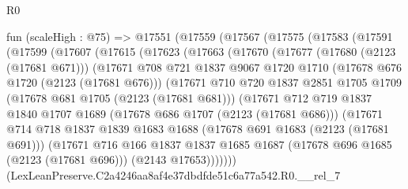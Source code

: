 \begin{lexlean}{R0}
\begin{coremodule}
        fun (scaleHigh : @75) =>
        @17551
          (@17559
            (@17567
              (@17575
                (@17583
                  (@17591
                    (@17599
                      (@17607
                        (@17615
                          (@17623
                            (@17663
                              (@17670
                                (@17677
                                  (@17680 (@2123 (@17681 @671)))
                                  (@17671
                                    @708
                                    @721
                                    @1837
                                    @9067
                                    @1720
                                    @1710
                                    (@17678 @676 @1720 (@2123 (@17681 @676)))
                                    (@17671
                                      @710
                                      @720
                                      @1837
                                      @2851
                                      @1705
                                      @1709
                                      (@17678 @681 @1705 (@2123 (@17681 @681)))
                                      (@17671
                                        @712
                                        @719
                                        @1837
                                        @1840
                                        @1707
                                        @1689
                                        (@17678 @686 @1707 (@2123 (@17681 @686)))
                                        (@17671
                                          @714
                                          @718
                                          @1837
                                          @1839
                                          @1683
                                          @1688
                                          (@17678 @691 @1683 (@2123 (@17681 @691)))
                                          (@17671
                                            @716
                                            @166
                                            @1837
                                            @1837
                                            @1685
                                            @1687
                                            (@17678 @696 @1685 (@2123 (@17681 @696)))
                                            (@2143 @17653)))))))
                                (LexLeanPreserve.C2a4246aa8af4e37dbdfde51c6a77a542.R0.__rel_7

\end{coremodule}
\end{lexlean}
